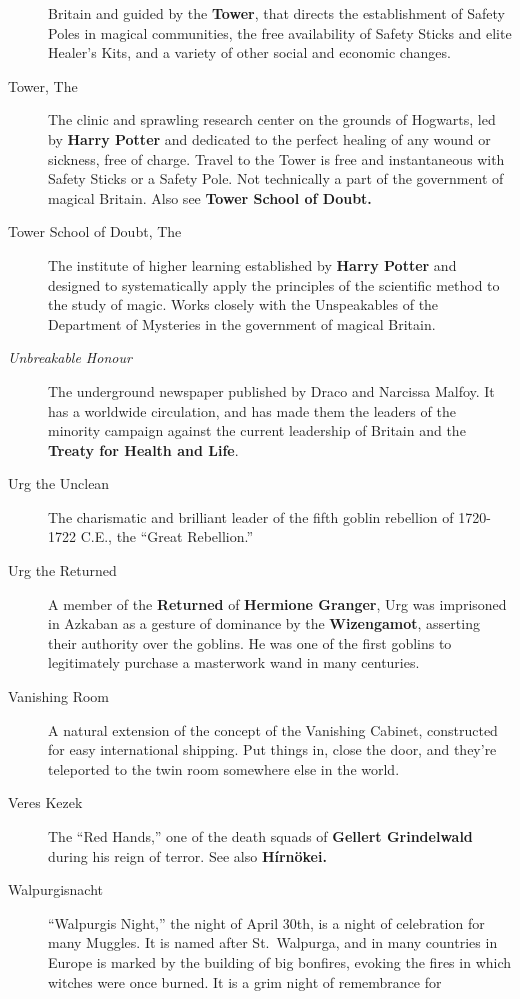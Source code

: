 \begin{description}
Britain and guided by the \textbf{Tower}, that directs the establishment
of Safety Poles in magical communities, the free availability of Safety
Sticks and elite Healer's Kits, and a variety of other social and
economic changes.
\item[Tower, The]
The clinic and sprawling research center on the grounds of Hogwarts, led
by \textbf{Harry Potter} and dedicated to the perfect healing of any
wound or sickness, free of charge. Travel to the Tower is free and
instantaneous with Safety Sticks or a Safety Pole. Not technically a
part of the government of magical Britain. Also see \textbf{Tower School
of Doubt.}
\item[Tower School of Doubt, The]
The institute of higher learning established by \textbf{Harry Potter}
and designed to systematically apply the principles of the scientific
method to the study of magic. Works closely with the Unspeakables of the
Department of Mysteries in the government of magical Britain.
\item[\emph{Unbreakable Honour}]
The underground newspaper published by Draco and Narcissa Malfoy. It has
a worldwide circulation, and has made them the leaders of the minority
campaign against the current leadership of Britain and the
\textbf{Treaty for Health and Life}.
\item[Urg the Unclean]
The charismatic and brilliant leader of the fifth goblin rebellion of
1720-1722 C.E., the ``Great Rebellion.''
\item[Urg the Returned]
A member of the \textbf{Returned }of \textbf{Hermione Granger}, Urg was
imprisoned in Azkaban as a gesture of dominance by the
\textbf{Wizengamot}, asserting their authority over the goblins. He was
one of the first goblins to legitimately purchase a masterwork wand in
many centuries.
\item[Vanishing Room]
A natural extension of the concept of the Vanishing Cabinet, constructed
for easy international shipping. Put things in, close the door, and
they're teleported to the twin room somewhere else in the world.
\item[Veres Kezek]
The ``Red Hands,'' one of the death squads of \textbf{Gellert
Grindelwald} during his reign of terror. See also \textbf{Hírnökei.}
\item[Walpurgisnacht]
``Walpurgis Night,'' the night of April 30th, is a night of celebration
for many Muggles. It is named after St.~Walpurga, and in many countries
in Europe is marked by the building of big bonfires, evoking the fires
in which witches were once burned. It is a grim night of remembrance for

\end{description}
